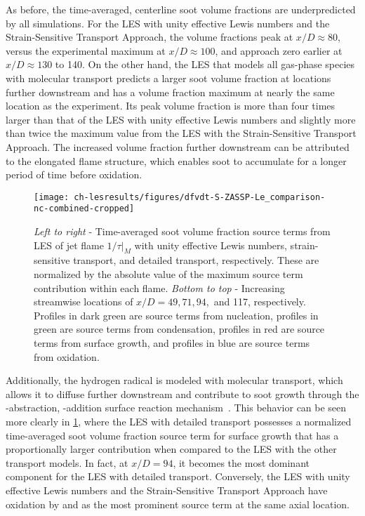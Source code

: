 As before, the time-averaged, centerline soot volume fractions are underpredicted by all simulations. For the LES with unity effective Lewis numbers and the Strain-Sensitive Transport Approach, the volume fractions peak at $x/D \approx 80$, versus the experimental maximum at $x/D \approx 100$, and approach zero earlier at $x/D \approx 130$ to 140. On the other hand, the LES that models all gas-phase species with molecular transport predicts a larger soot volume fraction at locations further downstream and has a volume fraction maximum at nearly the same location as the experiment. Its peak volume fraction is more than four times larger than that of the LES with unity effective Lewis numbers and slightly more than twice the maximum value from the LES with the Strain-Sensitive Transport Approach. The increased volume fraction further downstream can be attributed to the elongated flame structure, which enables soot to accumulate for a longer period of time before oxidation. %

\begin{figure}[H]
  \centering
  \texttt{[image: ch-lesresults/figures/dfvdt-S-ZASSP-Le\_comparison-nc-combined-cropped]}
  \caption[Radial \texorpdfstring{$\langle df_V/dt \rangle/|\langle df_V/dt|_{\text{max}} \rangle|$}{<dfV/dt>/|<dfV/dt>|max|} from LES with Various Transport Approaches]{\textit{Left to right} - Time-averaged soot volume fraction source terms from LES of jet flame $1/\tau|_M$ with unity effective Lewis numbers, strain-sensitive transport, and detailed transport, respectively. These are normalized by the absolute value of the maximum source term contribution within each flame. \textit{Bottom to top} - Increasing streamwise locations of $x/D = 49, 71, 94,$ and 117, respectively. Profiles in dark green are source terms from nucleation, profiles in green are source terms from condensation, profiles in red are source terms from surface growth, and profiles in blue are source terms from oxidation.}
  \label{fig:lesresults:ssta:radialdfvdtf2lecomparison}
\end{figure}

Additionally, the hydrogen radical is modeled with molecular transport, which allows it to diffuse further downstream and contribute to soot growth through the -abstraction, -addition surface reaction mechanism~\cite{frenklach1985,frenklach1991}. This behavior can be seen more clearly in \cref{fig:lesresults:ssta:radialdfvdtf2lecomparison}, where the LES with detailed transport possesses a normalized time-averaged soot volume fraction source term for surface growth that has a proportionally larger contribution when compared to the LES with the other transport models. In fact, at $x/D = 94$, it becomes the most dominant component for the LES with detailed transport. Conversely, the LES with unity effective Lewis numbers and the Strain-Sensitive Transport Approach have oxidation by  and  as the most prominent source term at the same axial location.

